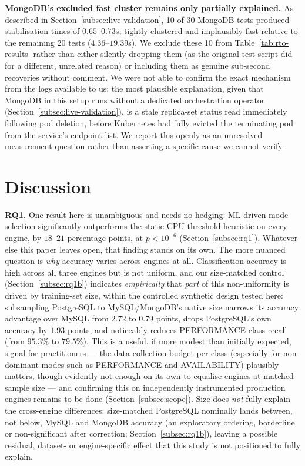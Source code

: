 \documentclass[iicol,pdflatex,sn-mathphys-num]{sn-jnl}
\theoremstyle{thmstyleone}
\theoremstyle{thmstylethree}
\begin{document}
\textbf{MongoDB's excluded fast cluster remains only partially
explained.} As described in Section~\ref{subsec:live-validation}, 10
of 30 MongoDB tests produced stabilisation times of $0.65$--$0.73$s,
tightly clustered and implausibly fast relative to the remaining 20
tests ($4.36$--$19.39$s). We exclude these 10 from
Table~\ref{tab:rto-results} rather than either silently dropping them
(as the original test script did for a different, unrelated reason)
or including them as genuine sub-second recoveries without comment.
We were not able to confirm the exact mechanism from the logs
available to us; the most plausible explanation, given that MongoDB
in this setup runs without a dedicated orchestration operator
(Section~\ref{subsec:live-validation}), is a stale replica-set status
read immediately following pod deletion, before Kubernetes had fully
evicted the terminating pod from the service's endpoint list. We
report this openly as an unresolved measurement question rather than
asserting a specific cause we cannot verify.

\section{Discussion}\label{sec:discussion}

\textbf{RQ1.} One result here is unambiguous and needs no hedging:
ML-driven mode selection significantly outperforms the static
CPU-threshold heuristic on every engine, by $18$--$21$ percentage
points, at $p<10^{-6}$ (Section~\ref{subsec:rq1}). Whatever else this
paper leaves open, that finding stands on its own. The more nuanced
question is \emph{why} accuracy varies across engines at all.
Classification accuracy is high across all three engines
but is not uniform, and our size-matched control
(Section~\ref{subsec:rq1b}) indicates \emph{empirically} that
\emph{part} of this non-uniformity is
driven by training-set size, within the controlled synthetic design
tested here: subsampling PostgreSQL to MySQL/MongoDB's native size
narrows its accuracy advantage over MySQL from $2.72$ to $0.79$
points, drops PostgreSQL's own accuracy by $1.93$ points, and
noticeably reduces PERFORMANCE-class recall (from $95.3\%$ to
$79.5\%$). This is a useful, if more modest than initially expected,
signal for practitioners --- the data collection budget per class
(especially for non-dominant modes such as PERFORMANCE and
AVAILABILITY) plausibly matters, though evidently not enough on its
own to equalise engines at matched sample size --- and confirming
this on independently instrumented production engines remains to be
done (Section~\ref{subsec:scope}). Size does \emph{not} fully explain
the cross-engine differences: size-matched PostgreSQL nominally lands
between, not below, MySQL and MongoDB accuracy (an exploratory
ordering, borderline or non-significant after correction;
Section~\ref{subsec:rq1b}), leaving a possible residual, dataset- or
engine-specific effect that this study is not positioned to fully
explain.
\end{document}
